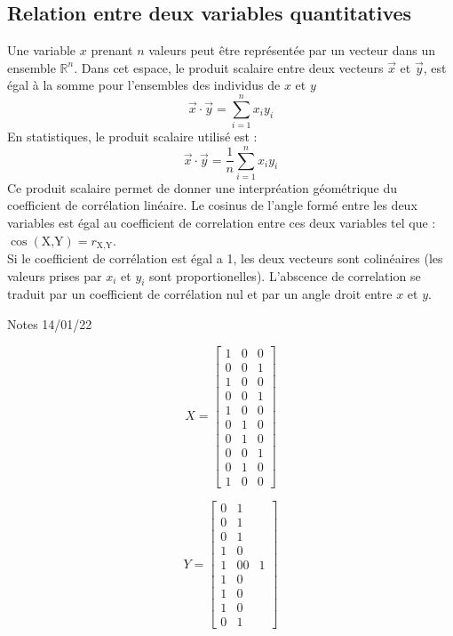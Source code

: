 \documentclass[a4paper]{article}
\begin{document}
\subsection{Relation entre deux variables quantitatives}
Une variable $x$ prenant $n$ valeurs peut être représentée par un vecteur dans un ensemble $\mathbb{R}^n$. Dans cet espace, le produit scalaire
entre deux vecteurs $\vec{x}$ et $\vec{y}$, est égal à la
somme pour l'ensembles des individus de $x$ et $y$ 
\begin{equation*}
    \vec{x} \cdot \vec{y} = \sum_{i = 1}^n x_i y_i 
\end{equation*}
En statistiques, le produit scalaire utilisé est :
\begin{equation*}
    \vec{x} \cdot \vec{y} = \frac{1}{n}\sum_{i = 1}^n x_i y_i 
\end{equation*}
Ce produit scalaire permet de donner une interpréation géométrique du coefficient de corrélation linéaire. Le cosinus de l'angle formé entre les deux
variables est égal au coefficient de correlation entre ces deux variables tel que : $\cos(\text{X,Y}) = r_{\text{X,Y}}$. \\

Si le coefficient de corrélation est égal a 1, les deux vecteurs sont colinéaires (les valeurs prises par $x_i$ et $y_i$ sont proportionelles).
L'abscence de correlation se traduit par un coefficient de corrélation nul et par un angle droit entre $x$ et $y$.

Notes 14/01/22

\begin{equation*}
    X = 
    \begin{bmatrix} 1&0&0 \\ 0&0&1 \\ 1&0&0 \\ 0&0&1 \\ 1&0&0 \\ 0&1&0 \\ 0&1&0 \\ 0&0&1 \\ 0&1&0 \\ 1&0&0 \end{bmatrix} 
\end{equation*}

\begin{equation*}
    Y =
    \begin{bmatrix} 0&1 \\ 0&1 \\ 0&1 \\ 1&0 \\ 1&0 0&1 \\ 1&0 \\ 1&0 \\ 1&0 \\ 0&1 \end{bmatrix} 
\end{equation*}
\end{document}
